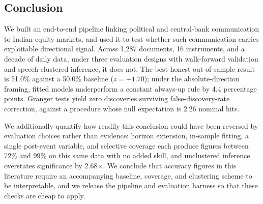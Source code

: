 \documentclass[11pt]{article}
\begin{document}
\subsection{Conclusion}
We built an end-to-end pipeline linking political and central-bank communication to Indian equity markets, and used it to test whether such communication carries exploitable directional signal. Across 1{,}287 documents, 16 instruments, and a decade of daily data, under three evaluation designs with walk-forward validation and speech-clustered inference, it does not. The best honest out-of-sample result is 51.0\% against a 50.0\% baseline ($z = +1.70$); under the absolute-direction framing, fitted models underperform a constant always-up rule by 4.4 percentage points. Granger tests yield zero discoveries surviving false-discovery-rate correction, against a procedure whose null expectation is 2.26 nominal hits.

We additionally quantify how readily this conclusion could have been reversed by evaluation choices rather than evidence: horizon extension, in-sample fitting, a single post-event variable, and selective coverage each produce figures between 72\% and 99\% on this same data with no added skill, and unclustered inference overstates significance by 2.68$\times$. We conclude that accuracy figures in this literature require an accompanying baseline, coverage, and clustering scheme to be interpretable, and we release the pipeline and evaluation harness so that these checks are cheap to apply.
\end{document}
